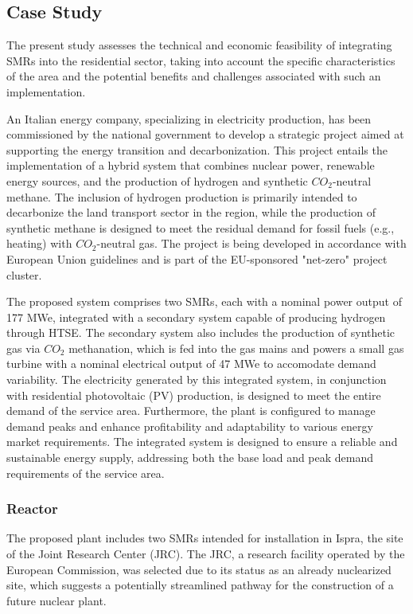 \subsection{Case Study}
The present study assesses the technical and economic feasibility of integrating SMRs into the residential sector, taking into account the specific characteristics of the area and the potential benefits and challenges associated with such an implementation.

An Italian energy company, specializing in electricity production, has been commissioned by the national government to develop a strategic project aimed at supporting the energy transition and decarbonization. This project entails the implementation of a hybrid system that combines nuclear power, renewable energy sources, and the production of hydrogen and synthetic $CO_2$-neutral methane. The inclusion of hydrogen production is primarily intended to decarbonize the land transport sector in the region, while the production of synthetic methane is designed to meet the residual demand for fossil fuels (e.g., heating) with $CO_2$-neutral gas. The project is being developed in accordance with European Union guidelines and is part of the EU-sponsored "net-zero" project cluster.

The proposed system comprises two SMRs, each with a nominal power output of 177 MWe, integrated with a secondary system capable of producing hydrogen through HTSE. The secondary system also includes the production of synthetic gas via $CO_2$ methanation, which is fed into the gas mains and powers a small gas turbine with a nominal electrical output of 47 MWe to accomodate demand variability. The electricity generated by this integrated system, in conjunction with residential photovoltaic (PV) production, is designed to meet the entire demand of the service area. Furthermore, the plant is configured to manage demand peaks and enhance profitability and adaptability to various energy market requirements. The integrated system is designed to ensure a reliable and sustainable energy supply, addressing both the base load and peak demand requirements of the service area.

\subsubsection{Reactor}
The proposed plant includes two SMRs intended for installation in Ispra, the site of the Joint Research Center (JRC). The JRC, a research facility operated by the European Commission, was selected due to its status as an already nuclearized site, which suggests a potentially streamlined pathway for the construction of a future nuclear plant.

